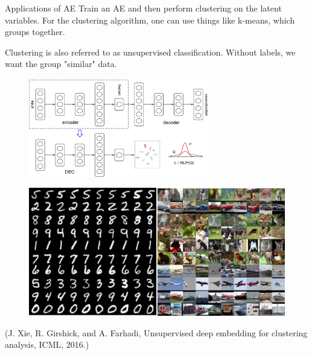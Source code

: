 \begin{frame}[allowframebreaks]

\begin{myconceptblock}{9.6}{Applications of AE}
    Train an AE and then perform clustering on the latent variables. For the clustering algorithm, one can use things like k-means, which groups together.

    Clustering is also referred to as unsupervised classification. Without labels, we want the group "similar" data.

    \begin{figure}[H]
        \centering
        \includegraphics[width=0.7\textwidth]{.././assets/9.4.png}
    \end{figure}

    \begin{figure}[H]
        \centering
        \includegraphics[width=1.0\textwidth]{.././assets/9.5.png}
    \end{figure}

    (J. Xie, R. Girshick, and A. Farhadi, Unsupervised deep embedding for clustering analysis, ICML, 2016.)
\end{myconceptblock}

\end{frame}

